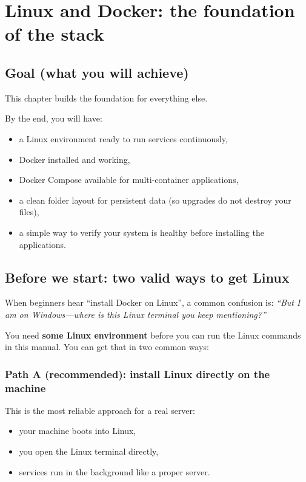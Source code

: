 \chapter{Linux and Docker: the foundation of the stack}
\label{ch:linux_docker}

\section{Goal (what you will achieve)}
This chapter builds the foundation for everything else.

By the end, you will have:
\begin{itemize}[leftmargin=*]
  \item a Linux environment ready to run services continuously,
  \item Docker installed and working,
  \item Docker Compose available for multi-container applications,
  \item a clean folder layout for persistent data (so upgrades do not destroy your files),
  \item a simple way to verify your system is healthy before installing the applications.
\end{itemize}

\section{Before we start: two valid ways to get Linux}
When beginners hear ``install Docker on Linux'', a common confusion is:
\emph{``But I am on Windows---where is this Linux terminal you keep mentioning?''}

You need \textbf{some Linux environment} before you can run the Linux commands in this manual.
You can get that in two common ways:

\subsection{Path A (recommended): install Linux directly on the machine}
This is the most reliable approach for a real server:
\begin{itemize}[leftmargin=*]
  \item your machine boots into Linux,
  \item you open the Linux terminal directly,
  \item services run in the background like a proper server.
\end{itemize}

